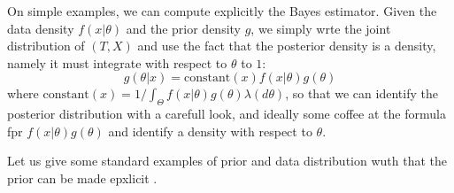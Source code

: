 \begin{recipe}
	On simple examples, we can compute explicitly the Bayes estimator. Given the data density $f(x | \theta)$ and  the prior density $g$, we simply wrte the joint distribution of $(T, X)$ and use the fact that the posterior density is a density, namely it must integrate with respect to $\theta$ to $1$:
	\begin{equation*}
		g(\theta | x) = \mathrm{constant}(x) f(x | \theta) g(\theta)
	\end{equation*}
	where $\mathrm{constant}(x) =  1 / \int_\Theta f(x | \theta) g(\theta) \lambda(d \theta)$, so that we can identify the posterior distribution with a carefull look, and ideally some coffee at the formula fpr $f(x | \theta) g(\theta)$ and identify a density with respect to $\theta$.
\end{recipe}

Let us give some standard examples of prior and data distribution wuth that the prior can be made epxlicit .


